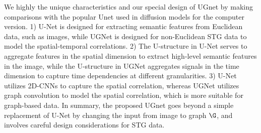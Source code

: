 {\par We highly the unique characteristics and our special design of UGnet by making comparisons with the popular Unet used in diffusion models for the computer version.  1) U-Net is designed for extracting semantic features from Euclidean data, such as images, while UGNet is designed for non-Euclidean STG data to model the spatial-temporal correlations. 2) The U-structure in U-Net serves to aggregate features in the spatial dimension to extract high-level semantic features in the image, while the U-structure in UGNet aggregates signals in the time dimension to capture time dependencies at different granularities. 3) U-Net utilizes 2D-CNNs to capture the spatial correlation, whereas UGNet utilizes graph convolution to model the spatial correlation, which is more suitable for graph-based data.  In summary, the proposed UGnet goes beyond a simple replacement of  U-Net by changing the input from image to graph $\G$,  and involves careful design considerations for STG data.

}
